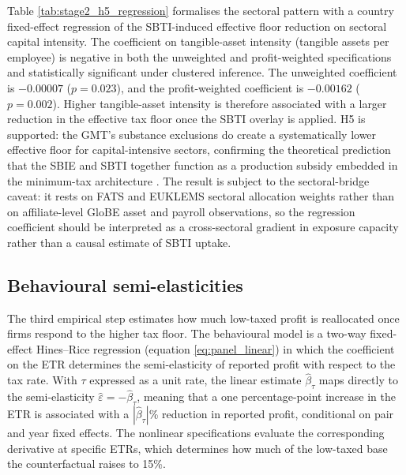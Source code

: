 \documentclass[11pt,a4paper]{article}
\begin{document}
Table \ref{tab:stage2_h5_regression} formalises the sectoral pattern with a country fixed-effect regression of the SBTI-induced effective floor reduction on sectoral capital intensity. The coefficient on tangible-asset intensity (tangible assets per employee) is negative in both the unweighted and profit-weighted specifications and statistically significant under clustered inference. The unweighted coefficient is $-0.00007$ ($p=0.023$), and the profit-weighted coefficient is $-0.00162$ ($p=0.002$). Higher tangible-asset intensity is therefore associated with a larger reduction in the effective tax floor once the SBTI overlay is applied. H5 is supported: the GMT's substance exclusions do create a systematically lower effective floor for capital-intensive sectors, confirming the theoretical prediction that the SBIE and SBTI together function as a production subsidy embedded in the minimum-tax architecture \citep{schjelderup2024}. The result is subject to the sectoral-bridge caveat: it rests on FATS and EUKLEMS sectoral allocation weights rather than on affiliate-level GloBE asset and payroll observations, so the regression coefficient should be interpreted as a cross-sectoral gradient in exposure capacity rather than a causal estimate of SBTI uptake.

\subsection{Behavioural semi-elasticities}\label{sec:results_stage3}

The third empirical step estimates how much low-taxed profit is reallocated once firms respond to the higher tax floor. The behavioural model is a two-way fixed-effect Hines--Rice regression (equation \ref{eq:panel_linear}) in which the coefficient on the ETR determines the semi-elasticity of reported profit with respect to the tax rate. With $\tau$ expressed as a unit rate, the linear estimate $\hat{\beta}_{\tau}$ maps directly to the semi-elasticity $\hat{\varepsilon}=-\hat{\beta}_{\tau}$, meaning that a one percentage-point increase in the ETR is associated with a $|\hat{\beta}_{\tau}|$\% reduction in reported profit, conditional on pair and year fixed effects. The nonlinear specifications evaluate the corresponding derivative at specific ETRs, which determines how much of the low-taxed base the counterfactual raises to 15\%.



\end{document}
